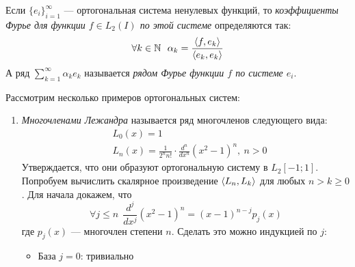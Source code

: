 \begin{definition}
	Если $\{e_i\}_{i = 1}^\infty$ --- ортогональная система ненулевых функций, то \textit{коэффициенты Фурье для функции $f \in L_2(I)$ по этой системе} определяются так:
	\[
			\forall k \in \mathbb{N}\ \ \alpha_k = \frac{\left\langle f, e_k\right\rangle}{\left\langle e_k, e_k\right\rangle}
	\]
	А ряд $\sum_{k = 1}^\infty \alpha_k e_k$ называется \textit{рядом Фурье функции $f$ по системе $e_i$}.
\end{definition}

\begin{example}
	Рассмотрим несколько примеров ортогональных систем:
	\begin{enumerate}
		\item \textit{Многочленами Лежандра} называется ряд многочленов следующего вида:
		\begin{align*}
			&{L_0(x) = 1}
			\\
			&{L_n(x) = \frac{1}{2^n n!} \cdot \frac{d^n}{dx^n} (x^2 - 1)^n,\ n > 0}
		\end{align*}
		Утверждается, что они образуют ортогональную систему в $L_2[-1; 1]$. Попробуем вычислить скалярное произведение $\left\langle L_n, L_k\right\rangle$ для любых $n > k \ge 0$. Для начала докажем, что
		\[
			\forall j \le n\ \ \frac{d^j}{dx^j}(x^2 - 1)^n = (x - 1)^{n - j} p_j(x)
		\]
		где $p_j(x)$ --- многочлен степени $n$. Сделать это можно индукцией по $j$:
		\begin{itemize}
			\item База $j = 0$: тривиально
			

\end{itemize}
\end{enumerate}
\end{example}
